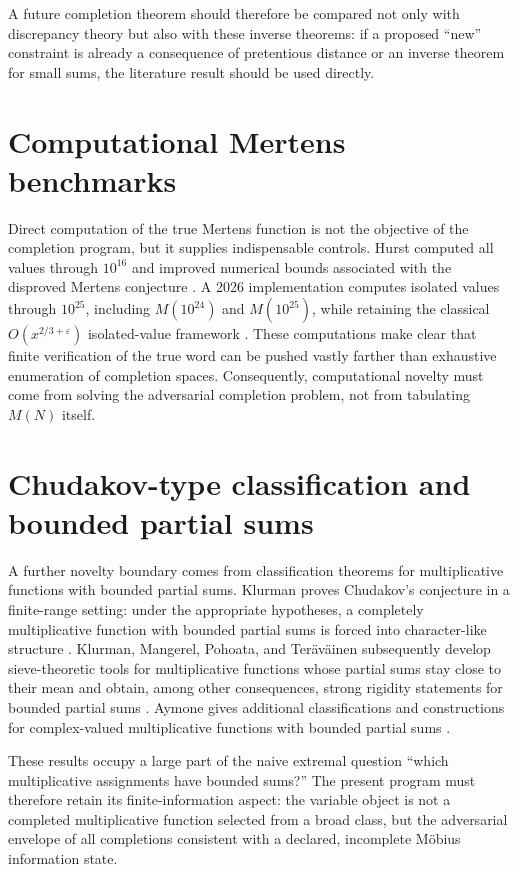 \documentclass[11pt]{article}
\begin{document}
A future completion theorem should therefore be compared not only with discrepancy theory but also with these inverse theorems: if a proposed ``new'' constraint is already a consequence of pretentious distance or an inverse theorem for small sums, the literature result should be used directly.

\section{Computational Mertens benchmarks}
Direct computation of the true Mertens function is not the objective of the completion program, but it supplies indispensable controls.  Hurst computed all values through $10^{16}$ and improved numerical bounds associated with the disproved Mertens conjecture \cite{Hurst2018}.  A 2026 implementation computes isolated values through $10^{25}$, including $M(10^{24})$ and $M(10^{25})$, while retaining the classical $O(x^{2/3+\varepsilon})$ isolated-value framework \cite{Hurst2026}.  These computations make clear that finite verification of the true word can be pushed vastly farther than exhaustive enumeration of completion spaces.  Consequently, computational novelty must come from solving the adversarial completion problem, not from tabulating $M(N)$ itself.


\section{Chudakov-type classification and bounded partial sums}
A further novelty boundary comes from classification theorems for multiplicative functions with bounded partial sums. Klurman proves Chudakov's conjecture in a finite-range setting: under the appropriate hypotheses, a completely multiplicative function with bounded partial sums is forced into character-like structure \cite{Klurman2018}. Klurman, Mangerel, Pohoata, and Teräväinen subsequently develop sieve-theoretic tools for multiplicative functions whose partial sums stay close to their mean and obtain, among other consequences, strong rigidity statements for bounded partial sums \cite{KMPT2021}. Aymone gives additional classifications and constructions for complex-valued multiplicative functions with bounded partial sums \cite{Aymone2023Bounded}.

These results occupy a large part of the naive extremal question ``which multiplicative assignments have bounded sums?''  The present program must therefore retain its finite-information aspect: the variable object is not a completed multiplicative function selected from a broad class, but the adversarial envelope of all completions consistent with a declared, incomplete Möbius information state.
\end{document}
